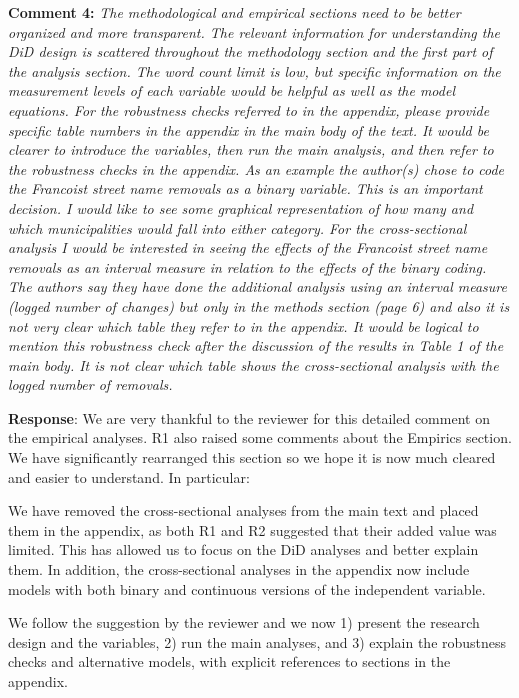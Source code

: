 \documentclass[12pt, a4paper, notitlepage]{article}
\begin{document}
\textbf{Comment 4:} \textit{The methodological and empirical sections need to be better organized and more transparent. The relevant information for understanding the DiD design is scattered throughout the methodology section and the first part of the analysis section. The word count limit is low, but specific information on the measurement levels of each variable would be helpful as well as the model equations. For the robustness checks referred to in the appendix, please provide specific table numbers in the appendix in the main body of the text. It would be clearer to introduce the variables, then run the main analysis, and then refer to the robustness checks in the appendix. As an example the author(s) chose to code the Francoist street name removals as a binary variable. This is an important decision. I would like to see some graphical representation of how many and which municipalities would fall into either category. For the cross-sectional analysis I would be interested in seeing the effects of the Francoist street name removals as an interval measure in relation to the effects of the binary coding. The authors say they have done the additional analysis using an interval measure (logged number of changes) but only in the methods section (page 6) and also it is not very clear which table they refer to in the appendix. It would be logical to mention this robustness check after the discussion of the results in Table 1 of the main body. It is not clear which table shows the cross-sectional analysis with the logged number of removals.}

\textbf{Response}: We are very thankful to the reviewer for this detailed comment on the empirical analyses.
R1 also raised some comments about the Empirics section.
We have significantly rearranged this section so we hope it is now much cleared and easier to understand.
In particular:

We have removed the cross-sectional analyses from the main text and placed them in the appendix, as both R1 and R2 suggested that their added value was limited.
This has allowed us to focus on the DiD analyses and better explain them.
In addition, the cross-sectional analyses in the appendix now include models with both binary and continuous versions of the independent variable.

We follow the suggestion by the reviewer and we now 1) present the research design and the variables, 2) run the main analyses, and 3) explain the robustness checks and alternative models, with explicit references to sections in the appendix.
\end{document}
